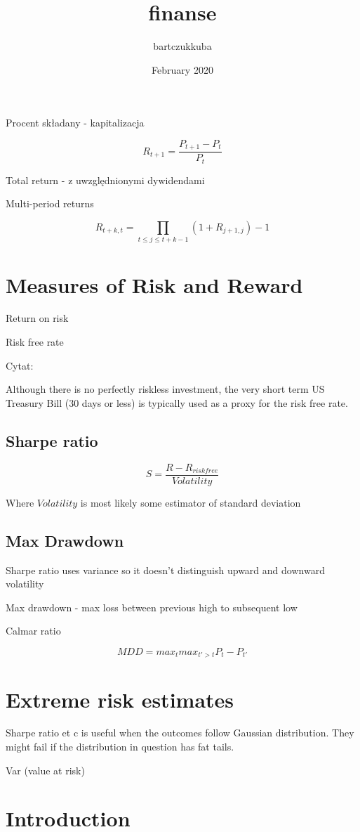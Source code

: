 \documentclass{article}
\title{finanse}
\author{bartczukkuba }
\date{February 2020}
\begin{document}
Procent składany - kapitalizacja

$$R_{t+1} = \frac{P_{t+1} - P_t}{P_t}$$

Total return - z uwzględnionymi dywidendami

Multi-period returns

$$R_{t+k, t} = \prod_{t \leq j \leq t+k-1}(1+R_{j+1, j}) - 1$$

\section{Measures of Risk and Reward}
Return on risk

Risk free rate

Cytat:

Although there is no perfectly riskless investment, the very short term US Treasury Bill (30 days or less) is typically used as a proxy for the risk free rate.

\subsection{Sharpe ratio}

$$S = \frac{R - R_{risk free}}{Volatility}$$

Where $Volatility$ is most likely some estimator of standard deviation

\subsection{Max Drawdown}

Sharpe ratio uses variance so it doesn't distinguish upward and downward volatility

Max drawdown - max loss between previous high to subsequent low

Calmar ratio

$$MDD = max_t max_{t' > t} P_t - P_{t'}$$

\section{Extreme risk estimates}

Sharpe ratio et c is useful when the outcomes follow Gaussian distribution. They might fail if the distribution in question has fat tails.

Var (value at risk)

\maketitle

\section{Introduction}
\end{document}
